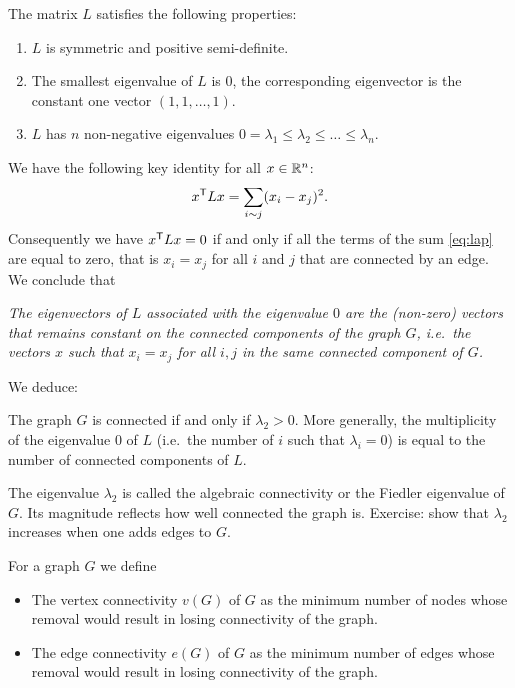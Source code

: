 \documentclass[11pt,nocut]{article}
\begin{document}
\begin{proposition}
	The matrix $L$ satisfies the following properties:
	\begin{enumerate}
		\item $L$ is symmetric and positive semi-definite.
		\item The smallest eigenvalue of $L$ is $0$, the corresponding eigenvector is the constant one vector $(1,1, \dots, 1)$.
		\item $L$ has $n$ non-negative eigenvalues $0 = \lambda_1 \leq \lambda_2 \leq \dots \leq \lambda_n$.
	\end{enumerate}
\end{proposition}

We have the following key identity for all $x \in \mathbb{R}^n$:
\begin{equation}\label{eq:lap}
x^{{\sf T}} L x = \sum_{i \sim j} (x_i - x_j)^2.
\end{equation}
Consequently we have $x^{{\sf T}} L x = 0$ if and only if all the terms of the sum \eqref{eq:lap} are equal to zero, that is $x_i = x_j$ for all $i$ and $j$ that are connected by an edge. We conclude that
\begin{center}
	\emph{
	The eigenvectors of $L$ associated with the eigenvalue $0$ are the (non-zero) vectors that remains constant on the connected components of the graph $G$, i.e.\ the vectors $x$ such that $x_i = x_j$ for all $i,j$ in the same connected component of $G$.}
\end{center}

We deduce:
\begin{proposition}\label{prop:lambda2}
	The graph $G$ is connected if and only if $\lambda_2 > 0$.
More generally, the multiplicity of the eigenvalue $0$ of $L$ (i.e.\ the number of $i$ such that $\lambda_i = 0$) is equal to the number of connected components of $L$.
\end{proposition}

The eigenvalue $\lambda_2$ is called the algebraic connectivity or the Fiedler eigenvalue of $G$. Its magnitude reflects how well connected the graph is.
Exercise: show that $\lambda_2$ increases when one adds edges to $G$.

\begin{definition}
	For a graph $G$ we define
	\begin{itemize}
		\item The vertex connectivity $v(G)$ of $G$ as the minimum number of nodes whose removal would result in losing connectivity of the graph.
		\item The edge connectivity $e(G)$ of $G$ as the minimum number of edges whose removal would result in losing connectivity of the graph.
	\end{itemize}
\end{definition}
\end{document}
